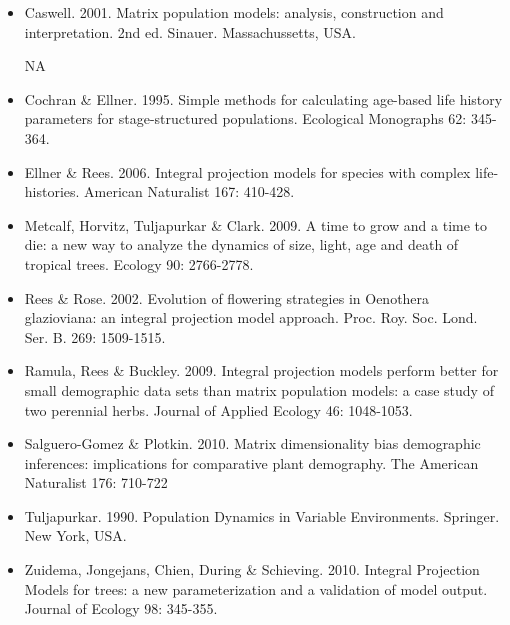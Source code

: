 \documentclass{article}
\begin{document}
\begin{itemize}
\item Caswell. 2001. Matrix population models: analysis, construction and interpretation. 2nd ed. Sinauer. Massachussetts, USA.

NA

\item Cochran \& Ellner. 1995. Simple methods for calculating age-based life history parameters for stage-structured populations. Ecological Monographs 62: 345-364.

\item Ellner \& Rees. 2006. Integral projection models for species with complex life-histories. American Naturalist 167: 410-428.

\item Metcalf, Horvitz, Tuljapurkar \& Clark. 2009. A time to grow and a time to die: a  new way to analyze the dynamics of size, light, age and death of tropical trees. Ecology 90: 2766-2778.

\item Rees \& Rose. 2002. Evolution of flowering strategies in Oenothera glazioviana: an integral projection model approach. Proc. Roy. Soc. Lond. Ser. B. 269: 1509-1515.

\item Ramula, Rees \& Buckley. 2009. Integral projection models perform better for small demographic data sets than matrix population models: a case study of two perennial herbs. Journal of Applied Ecology 46: 1048-1053.

\item Salguero-Gomez \& Plotkin. 2010. Matrix dimensionality bias demographic inferences: implications for comparative plant demography. The American Naturalist 176: 710-722

\item Tuljapurkar. 1990. Population Dynamics in Variable Environments. Springer. New York, USA.

\item Zuidema, Jongejans, Chien, During \& Schieving. 2010. Integral Projection Models for trees: a new parameterization and a validation of model output. Journal of Ecology 98: 345-355.


\end{itemize}


\end{document}

